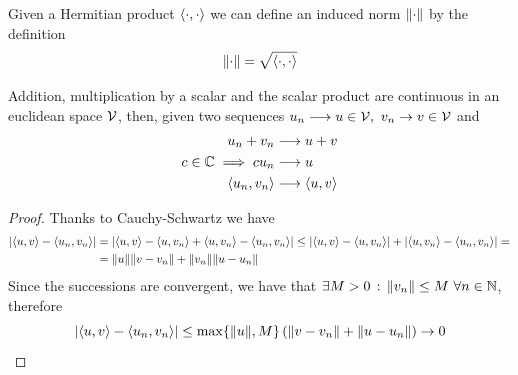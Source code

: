\documentclass[../complete.tex]{subfiles}
\begin{document}
\begin{thm}
	Given a Hermitian product $\langle \cdot, \cdot \rangle$ we can define an induced norm $\norm{\cdot}$ by the definition
	\begin{equation}
		\norm{\cdot}=\sqrt{\langle \cdot, \cdot \rangle}
		\label{eq:indnorm}
	\end{equation}
\end{thm}
\begin{thm}
	Addition, multiplication by a scalar and the scalar product are continuous in an euclidean space $\mathcal{V}$, then, given two sequences $u_n\fto u\in\V,\ v_n\to v\in\V$ and
	\begin{equation*}
		\begin{aligned}
			u_n+v_n&\overset{}{\longrightarrow} u+v\\
			c\in\mathbb{C}\implies{} cu_n&\overset{}{\longrightarrow} u\\
			\langle u_n, v_n \rangle&\overset{}{\longrightarrow}\langle u, v \rangle
		\end{aligned}
	\end{equation*}
\end{thm}
\begin{proof}
	Thanks to Cauchy-Schwartz we have
	\begin{equation*}
		\begin{aligned}
			\abs{\langle u, v \rangle-\langle u_n, v_n \rangle}&=\abs{\langle u, v \rangle-\langle u, v_n \rangle+\langle u, v_n \rangle-\langle u_n, v_n \rangle}\le\abs{\langle u, v \rangle-\langle u, v_n \rangle}+\abs{\langle u, v_n \rangle-\langle u_n, v_n \rangle}=\\
			&=\norm{u}\norm{v-v_n}+\norm{v_n}\norm{u-u_n}
		\end{aligned}
	\end{equation*}
	Since the successions are convergent, we have that $\exists M>0\st\norm{v_n}\le M\ \forall n\in\N$, therefore
	\begin{equation*}
		\abs{\langle u, v \rangle-\langle u_n, v_n \rangle}\le\max\{\norm{u},M\}\left( \norm{v-v_n}+\norm{u-u_n} \right)\to0
	\end{equation*}
\end{proof}
\end{document}
